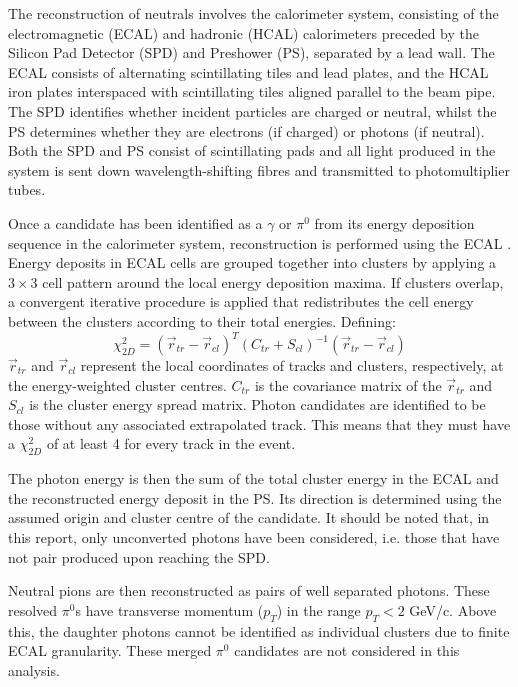 \documentclass[oneside,12pt]{article}
\begin{document}
The reconstruction of neutrals involves the calorimeter system, consisting of
the electromagnetic (ECAL) and hadronic (HCAL) calorimeters preceded by the
Silicon Pad Detector (SPD) and Preshower (PS), separated by a lead wall. The
ECAL consists of alternating scintillating tiles and lead plates, and the HCAL
iron plates interspaced with scintillating tiles aligned parallel to the beam
pipe. The SPD identifies whether incident particles are charged or neutral,
whilst the PS determines whether they are electrons (if charged) or photons (if
neutral). Both the SPD and PS consist of scintillating pads and all light
produced in the system is sent down wavelength-shifting fibres and transmitted
to photomultiplier tubes.

Once a candidate has been identified as a $\gamma$ or $\pi^0$ from its energy
deposition sequence in the calorimeter system, reconstruction is performed using
the ECAL \cite{NeutralReconstruction}. Energy deposits in ECAL cells are grouped
together into clusters by applying a $3\times3$ cell pattern around the local
energy deposition maxima. If clusters overlap, a convergent iterative procedure
is applied that redistributes the cell energy between the clusters according to
their total energies.  Defining: 
\begin{equation}
  \chi^2_{2D}=(\vec{r}_{tr}-\vec{r}_{cl})^T(C_{tr}+S_{cl})^{-1}(\vec{r}_{tr}-\vec{r}_{cl})
  \label{Chi2}
\end{equation}
$\vec{r}_{tr}$ and $\vec{r}_{cl}$ represent the local coordinates of tracks and
clusters, respectively, at the energy-weighted cluster centres. $C_{tr}$ is the
covariance matrix of the $\vec{r}_{tr}$ and $S_{cl}$ is the cluster energy
spread matrix. Photon candidates are identified to be those without any
associated extrapolated track. This means that they must have a $\chi^2_{2D}$ of
at least 4 for every track in the event. 

The photon energy is then the sum of the total cluster energy in the ECAL and
the reconstructed energy deposit in the PS. Its direction is determined using
the assumed origin and cluster centre of the candidate. It should be noted that,
in this report, only unconverted photons have been considered, i.e. those that
have not pair produced upon reaching the SPD.

Neutral pions are then reconstructed as pairs of well separated photons. These
resolved $\pi^0$s have transverse momentum ($p_T$) in the range $p_{T}<2$ GeV/c.
Above this, the daughter photons cannot be identified as individual clusters due
to finite ECAL granularity. These merged $\pi^0$ candidates are not considered
in this analysis.
\end{document}
